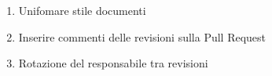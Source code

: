 \begin{enumerate}
    \item Unifomare stile documenti
    \item Inserire commenti delle revisioni sulla Pull Request
    \item Rotazione del responsabile tra revisioni
\end{enumerate}